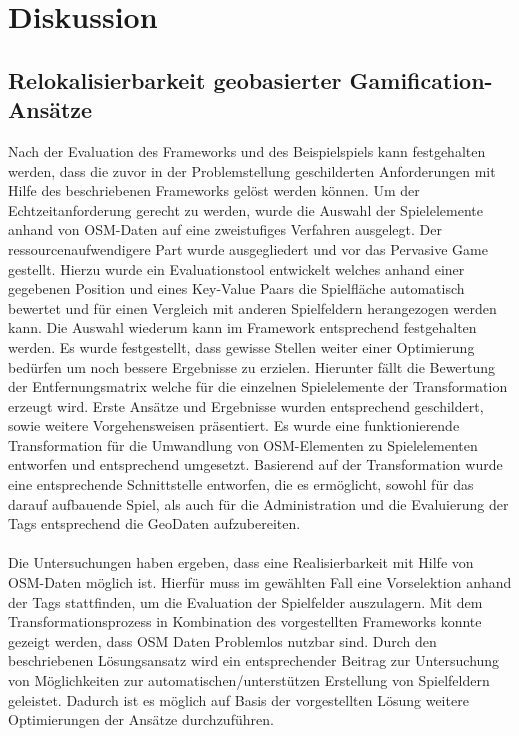 \chapter{Diskussion}
\label{sec:S7_Diskussion}

\section*{Relokalisierbarkeit geobasierter Gamification-Ansätze}

Nach der Evaluation des Frameworks und des Beispielspiels kann festgehalten werden, dass die zuvor in der Problemstellung geschilderten Anforderungen mit Hilfe des beschriebenen Frameworks gelöst werden können. Um der Echtzeitanforderung gerecht zu werden, wurde die Auswahl der Spielelemente anhand von OSM-Daten auf eine zweistufiges Verfahren ausgelegt. Der ressourcenaufwendigere Part wurde ausgegliedert und vor das Pervasive Game gestellt. Hierzu wurde ein Evaluationstool entwickelt welches anhand einer gegebenen Position und eines Key-Value Paars die Spielfläche automatisch bewertet und für einen Vergleich mit anderen Spielfeldern herangezogen werden kann.
Die Auswahl wiederum kann im Framework entsprechend festgehalten werden. Es wurde festgestellt, dass gewisse Stellen weiter einer Optimierung bedürfen um noch bessere Ergebnisse zu erzielen. Hierunter fällt die Bewertung der Entfernungsmatrix welche für die einzelnen Spielelemente der Transformation erzeugt wird. Erste Ansätze und Ergebnisse wurden entsprechend geschildert, sowie weitere Vorgehensweisen präsentiert.
Es wurde eine funktionierende Transformation für die Umwandlung von OSM-Elementen zu Spielelementen entworfen und entsprechend umgesetzt.
Basierend auf der Transformation wurde eine entsprechende Schnittstelle entworfen, die es ermöglicht, sowohl für das darauf aufbauende Spiel, als auch für die Administration und die Evaluierung der Tags entsprechend die GeoDaten aufzubereiten.
\\\\
Die Untersuchungen haben ergeben, dass eine Realisierbarkeit mit Hilfe von OSM-Daten möglich ist. Hierfür muss im gewählten Fall eine Vorselektion anhand der Tags stattfinden, um die Evaluation der Spielfelder auszulagern. Mit dem Transformationsprozess in Kombination des vorgestellten Frameworks konnte gezeigt werden, dass OSM Daten Problemlos nutzbar sind. Durch den beschriebenen Lösungsansatz wird ein entsprechender Beitrag zur Untersuchung von Möglichkeiten zur automatischen/unterstützen Erstellung von Spielfeldern geleistet. Dadurch ist es möglich auf Basis der vorgestellten Lösung weitere Optimierungen der Ansätze durchzuführen. 

